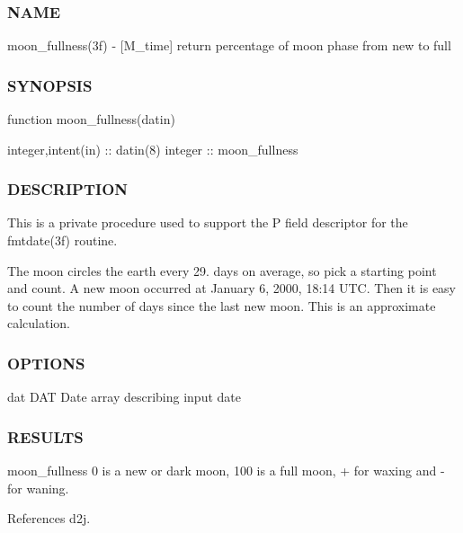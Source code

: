 \begin{DoxyVerb}
\subsubsection*{N\+A\+ME}

moon\+\_\+fullness(3f) -\/ \mbox{[}M\+\_\+time\mbox{]} return percentage of moon phase from new to full \subsubsection*{S\+Y\+N\+O\+P\+S\+IS}

function moon\+\_\+fullness(datin)

integer,intent(in) \+:\+: datin(8) integer \+:\+: moon\+\_\+fullness

\subsubsection*{D\+E\+S\+C\+R\+I\+P\+T\+I\+ON}

This is a private procedure used to support the P field descriptor for the fmtdate(3f) routine.

The moon circles the earth every 29. days on average, so pick a starting point and count. A new moon occurred at January 6, 2000, 18\+:14 U\+TC. Then it is easy to count the number of days since the last new moon. This is an approximate calculation.

\subsubsection*{O\+P\+T\+I\+O\+NS}

dat D\+AT Date array describing input date

\subsubsection*{R\+E\+S\+U\+L\+TS}

moon\+\_\+fullness 0 is a new or dark moon, 100 is a full moon, + for waxing and -\/ for waning. 

References d2j.

\mbox{\label{namespacem__time_a6b5e87be0e510ff268c1ecfbf67a3bdb}} 

\end{DoxyVerb}
